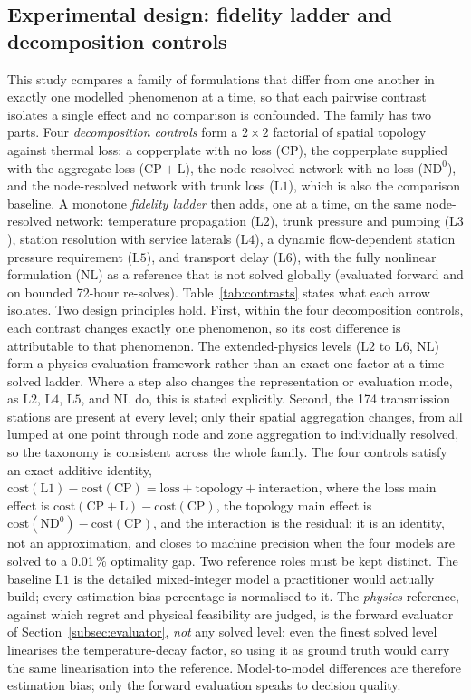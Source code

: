 \documentclass[a4paper,fleqn]{cas-sc}
\newcommand{\CP}{\ensuremath{\mathrm{CP}}}      %
\newcommand{\CPL}{\ensuremath{\mathrm{CP{+}L}}} %
\newcommand{\NDz}{\ensuremath{\mathrm{ND^{0}}}} %
\newcommand{\Lone}{\ensuremath{\mathrm{L1}}}    %
\newcommand{\Ltwo}{\ensuremath{\mathrm{L2}}}    %
\newcommand{\Lthree}{\ensuremath{\mathrm{L3}}}  %
\newcommand{\Lfour}{\ensuremath{\mathrm{L4}}}   %
\newcommand{\Lfive}{\ensuremath{\mathrm{L5}}}   %
\newcommand{\Lsix}{\ensuremath{\mathrm{L6}}}    %
\newcommand{\NLref}{\ensuremath{\mathrm{NL}}}   %
\begin{document}
\subsection{Experimental design: fidelity ladder and decomposition controls}
This study compares a family of formulations that differ from one another in exactly one
modelled phenomenon at a time, so that each pairwise contrast isolates a single effect and no
comparison is confounded. The family has two parts. Four \emph{decomposition controls} form a
$2\times2$ factorial of spatial topology against thermal loss: a copperplate with no loss
($\CP$), the copperplate supplied with the aggregate loss ($\CPL$), the node-resolved network
with no loss ($\NDz$), and the node-resolved network with trunk loss ($\Lone$), which is also
the comparison baseline. A monotone \emph{fidelity ladder} then adds, one at a time, on the
same node-resolved network: temperature propagation ($\Ltwo$), trunk pressure and pumping
($\Lthree$), station resolution with service laterals ($\Lfour$), a dynamic flow-dependent
station pressure requirement ($\Lfive$), and transport delay ($\Lsix$), with the fully
nonlinear formulation ($\NLref$) as a reference that is not solved globally (evaluated
forward and on bounded 72-hour re-solves). Table~\ref{tab:contrasts} states
what each arrow isolates. Two design principles hold. First, within the four decomposition controls, each contrast changes exactly one
phenomenon, so its cost difference is attributable to that phenomenon. The
extended-physics levels (\(\Ltwo\) to \(\Lsix\), \(\NLref\)) form a
physics-evaluation framework rather than an exact one-factor-at-a-time solved
ladder. Where a step also changes the representation or evaluation mode, as
\(\Ltwo\), \(\Lfour\), \(\Lfive\), and \(\NLref\) do, this is stated explicitly. Second, the 174 transmission stations
are present at every level; only their spatial aggregation changes, from all lumped at one
point through node and zone aggregation to individually resolved, so the taxonomy is consistent
across the whole family. The four controls satisfy an exact additive identity,
$\text{cost}(\Lone)-\text{cost}(\CP)=\text{loss}+\text{topology}+\text{interaction}$, where the
loss main effect is $\text{cost}(\CPL)-\text{cost}(\CP)$, the topology main effect is
$\text{cost}(\NDz)-\text{cost}(\CP)$, and the interaction is the residual; it is an identity,
not an approximation, and closes to machine precision when the four models are solved to a
0.01\,\% optimality gap.
Two reference roles must be kept distinct. The baseline $\Lone$ is the detailed
mixed-integer model a practitioner would actually build; every estimation-bias percentage is
normalised to it. The \emph{physics} reference, against which regret and physical feasibility
are judged, is the forward evaluator of Section~\ref{subsec:evaluator}, \emph{not} any solved
level: even the finest solved level linearises the temperature-decay factor, so using it as
ground truth would carry the same linearisation into the reference. Model-to-model differences
are therefore estimation bias; only the forward evaluation speaks to decision quality.

\end{document}
